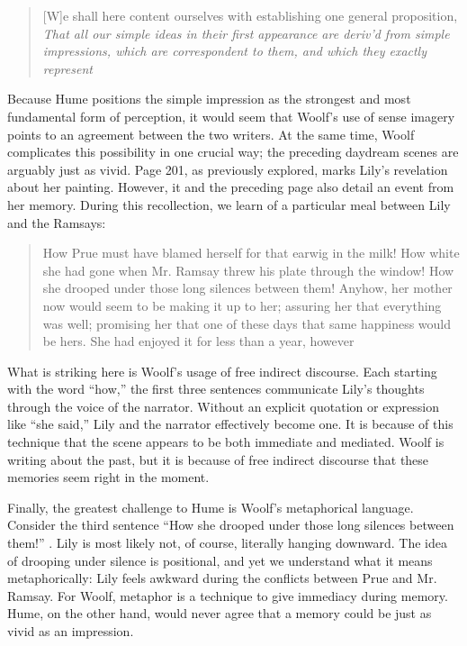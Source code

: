 \blockcquote[][4]{hume_78}[.]{[W]e shall here content ourselves with establishing one general proposition, \emph{That all our simple ideas in their first appearance are deriv'd from simple impressions, which are correspondent to them, and which they exactly represent}}

Because Hume positions the simple impression as the strongest and most fundamental form of perception, it would seem that Woolf's use of sense imagery points to an agreement between the two writers. At the same time, Woolf complicates this possibility in one crucial way; the preceding daydream scenes are arguably just as vivid. Page 201, as previously explored, marks Lily's revelation about her painting. However, it and the preceding page also detail an event from her memory. During this recollection, we learn of a particular meal between Lily and the Ramsays:

\blockcquote[][200-201]{woolf_81}[.]{How Prue must have blamed herself for that earwig in the milk! How white she had gone when Mr. Ramsay threw his plate through the window! How she drooped under those long silences between them! Anyhow, her mother now would seem to be making it up to her; assuring her that everything was well; promising her that one of these days that same happiness would be hers. She had enjoyed it for less than a year, however}

What is striking here is Woolf's usage of free indirect discourse. Each starting with the word ``how,'' the first three sentences communicate Lily's thoughts through the voice of the narrator. Without an explicit quotation or expression like ``she said,'' Lily and the narrator effectively become one. It is because of this technique that the scene appears to be both immediate and mediated. Woolf is writing about the past, but it is because of free indirect discourse that these memories seem right in the moment.

Finally, the greatest challenge to Hume is Woolf's metaphorical language. Consider the third sentence \enquote{How she drooped under those long silences between them!} \autocite[201]{woolf_81}. Lily is most likely not, of course, literally hanging downward. The idea of drooping under silence is positional, and yet we understand what it means metaphorically: Lily feels awkward during the conflicts between Prue and Mr. Ramsay. For Woolf, metaphor is a technique to give immediacy during memory. Hume, on the other hand, would never agree that a memory could be just as vivid as an impression.

